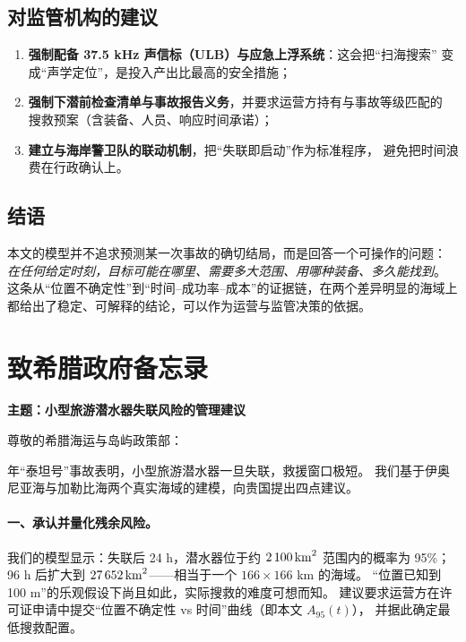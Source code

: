 \subsection{对监管机构的建议}

\begin{enumerate}[leftmargin=1.8em,itemsep=1pt]
\item \textbf{强制配备 37.5 kHz 声信标（ULB）与应急上浮系统}：这会把“扫海搜索”
      变成“声学定位”，是投入产出比最高的安全措施；
\item \textbf{强制下潜前检查清单与事故报告义务}，并要求运营方持有与事故等级匹配的
      搜救预案（含装备、人员、响应时间承诺）；
\item \textbf{建立与海岸警卫队的联动机制}，把“失联即启动”作为标准程序，
      避免把时间浪费在行政确认上。
\end{enumerate}

\subsection{结语}

本文的模型并不追求预测某一次事故的确切结局，而是回答一个可操作的问题：
\emph{在任何给定时刻，目标可能在哪里、需要多大范围、用哪种装备、多久能找到}。
这条从“位置不确定性”到“时间–成功率–成本”的证据链，在两个差异明显的海域上
都给出了稳定、可解释的结论，可以作为运营与监管决策的依据。

\section*{致希腊政府备忘录}

\noindent\textbf{主题：小型旅游潜水器失联风险的管理建议}

\vspace{1mm}
\noindent 尊敬的希腊海运与岛屿政策部：

\vspace{1mm}
 年“泰坦号”事故表明，小型旅游潜水器一旦失联，救援窗口极短。
我们基于伊奥尼亚海与加勒比海两个真实海域的建模，向贵国提出四点建议。

\paragraph{一、承认并量化残余风险。}
我们的模型显示：失联后 24 h，潜水器位于约 $2\,100\,\mathrm{km}^2$ 范围内的概率为 95\%；
96 h 后扩大到 $27\,652\,\mathrm{km}^2$——相当于一个 $166\times166$ km 的海域。
“位置已知到 100 m”的乐观假设下尚且如此，实际搜救的难度可想而知。
建议要求运营方在许可证申请中提交“位置不确定性 vs 时间”曲线（即本文 $A_{95}(t)$），
并据此确定最低搜救配置。


